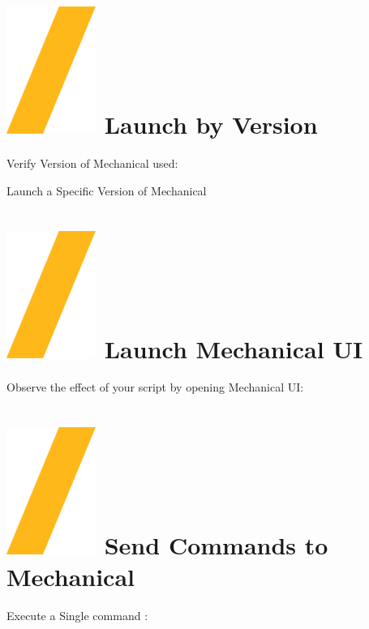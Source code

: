 \documentclass[9pt,landscape]{article}
\begin{document}
\begin{multicols}{3}
\section{\includegraphics[height=\fontcharht\font`\S]{slash.png} Launch by Version}

Verify Version of Mechanical used:


Launch a Specific Version of Mechanical



\section{\includegraphics[height=\fontcharht\font`\S]{slash.png} Launch  Mechanical UI}

Observe the effect of your script by opening Mechanical UI:



\vfill


\section{\includegraphics[height=\fontcharht\font`\S]{slash.png} Send Commands to Mechanical}
Execute a Single command :


\end{multicols}
\end{document}
